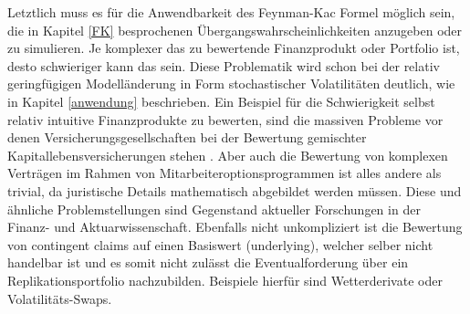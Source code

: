 \documentclass[12pt,a4paper,headsepline,bibliography=totoc,listof=totoc,headinclude=false,footinclude=false,BCOR5mm]{scrreprt} %
\begin{document}
Letztlich muss es f\"ur die Anwendbarkeit des Feynman-Kac Formel m\"oglich sein, die in Kapitel \ref{FK} besprochenen \"Ubergangswahrscheinlichkeiten anzugeben oder zu simulieren. Je komplexer das zu bewertende Finanzprodukt oder Portfolio ist, desto schwieriger kann das sein. Diese Problematik wird schon bei der relativ geringf\"ugigen Modell\"anderung in Form stochastischer Volatilit\"aten deutlich, wie in Kapitel \ref{anwendung} beschrieben. Ein Beispiel f\"ur die Schwierigkeit selbst relativ intuitive Finanzprodukte zu bewerten, sind die massiven Probleme vor denen Versicherungsgesellschaften bei der Bewertung gemischter Kapitallebensversicherungen stehen \cite{Zaglauer2006}. Aber auch die Bewertung von komplexen Vertr\"agen im Rahmen von Mitarbeiteroptionsprogrammen ist alles andere als trivial, da juristische Details mathematisch abgebildet werden m\"ussen. Diese und \"ahnliche Problemstellungen sind Gegenstand aktueller Forschungen in der Finanz- und Aktuarwissenschaft. Ebenfalls nicht unkompliziert ist die Bewertung von contingent claims auf einen Basiswert (underlying), welcher selber nicht handelbar ist und es somit nicht zul\"asst die Eventualforderung \"uber ein Replikationsportfolio nachzubilden. Beispiele hierf\"ur sind Wetterderivate oder Volatilit\"ats-Swaps.




\end{document}
